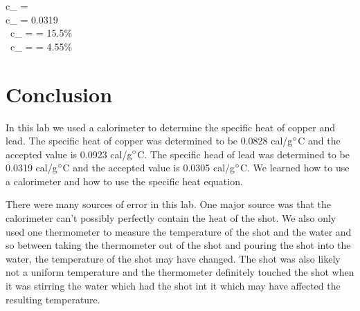 \documentclass[12pt]{article}
\begin{document}
           c_{} = \\
           c_{} = 0.0319~\degree{}\\
           ~c_{}  =  = 15.5\%\\
           ~c_{} =  = 4.55\%
        \)
    \section*{Conclusion}
        In this lab we used a calorimeter to determine the specific heat of copper and lead. The specific heat of copper was determined to be 0.0828 cal/g\(\degree\)C and the accepted value is 0.0923 cal/g\(\degree\)C. The specific head of lead was determined to be 0.0319 cal/g\(\degree\)C and the accepted value is 0.0305 cal/g\(\degree\)C. We learned how to use a calorimeter and how to use the specific heat equation.

        There were many sources of error in this lab. One major source was that the calorimeter can't possibly perfectly contain the heat of the shot. We also only used one thermometer to measure the temperature of the shot and the water and so between taking the thermometer out of the shot and pouring the shot into the water, the temperature of the shot may have changed. The shot was also likely not a uniform temperature and the thermometer definitely touched the shot when it was stirring the water which had the shot int it which may have affected the resulting temperature.
\end{document}
